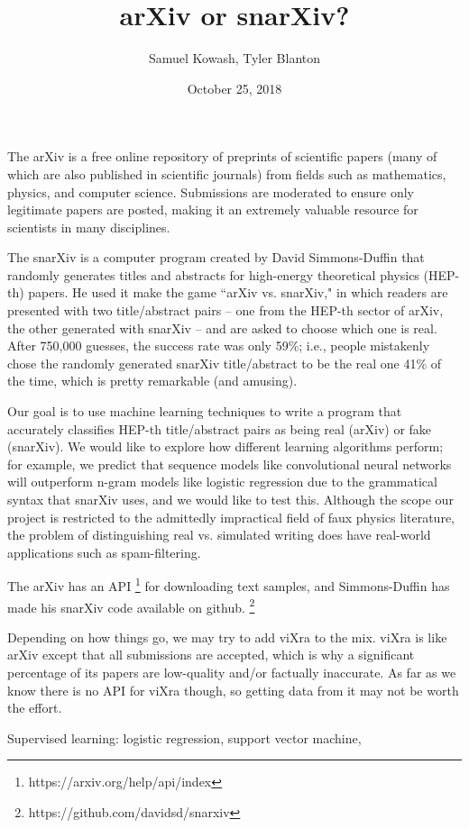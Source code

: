 \documentclass{article}
\title{arXiv or snarXiv?}
\author{Samuel Kowash, Tyler Blanton}
\date{October 25, 2018}
\begin{document}
\maketitle
The arXiv is a free online repository of preprints of scientific papers (many of which are also published in scientific journals) from fields such as mathematics, physics, and computer science.
Submissions are moderated to ensure only legitimate papers are posted, making it an extremely valuable resource for scientists in many disciplines.

The snarXiv is a computer program created by David Simmons-Duffin that randomly generates titles and abstracts for high-energy theoretical physics (HEP-th) papers.
He used it make the game ``arXiv vs. snarXiv," in which readers are presented with two title/abstract pairs -- one from the HEP-th sector of arXiv, the other generated with snarXiv -- and are asked to choose which one is real.
After 750,000 guesses, the success rate was only 59\%; i.e., people mistakenly chose the randomly generated snarXiv title/abstract to be the real one 41\% of the time, which is pretty remarkable (and amusing).

Our goal is to use machine learning techniques to write a program that accurately classifies HEP-th title/abstract pairs as being real (arXiv) or fake (snarXiv).
We would like to explore how different learning algorithms perform; for example, we predict that sequence models like convolutional neural networks will outperform n-gram models like logistic regression due to the grammatical syntax that snarXiv uses, and we would like to test this.
Although the scope our project is restricted to the admittedly impractical field of faux physics literature, the problem of distinguishing real vs. simulated writing does have real-world applications such as spam-filtering. 


The arXiv has an API%
\footnote{https://arxiv.org/help/api/index}
for downloading text samples, and Simmons-Duffin has made his snarXiv code available on github.%
\footnote{https://github.com/davidsd/snarxiv}
%





Depending on how things go, we may try to add viXra to the mix.
viXra is like arXiv except that all submissions are accepted, which is why a significant percentage of its papers are low-quality and/or factually inaccurate.
As far as we know there is no API for viXra though, so getting data from it may not be worth the effort.


Supervised learning: logistic regression, support vector machine, 
\end{document}
